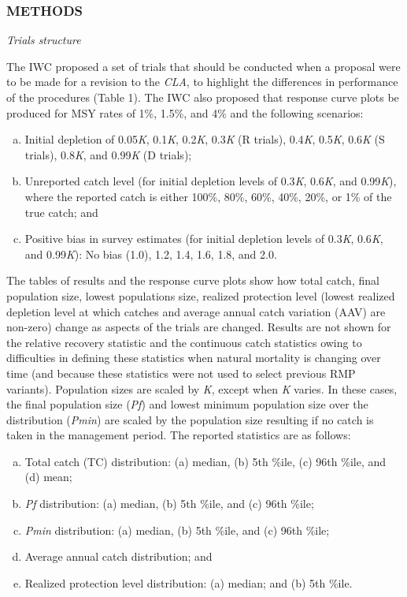 \documentclass[]{article}
\begin{document}
\subsubsection{METHODS}\label{methods}

\emph{Trials structure}

The IWC \autocite{iwc_2007} proposed a set of trials that should be
conducted when a proposal were to be made for a revision to the
\emph{CLA}, to highlight the differences in performance of the
procedures (Table 1). The IWC \autocite{iwc_2007} also proposed
that response curve plots be produced for MSY rates of 1\%, 1.5\%, and
4\% and the following scenarios:

\begin{enumerate}[a.]
\itemsep1pt\parskip0pt
\item
  Initial depletion of 0.05\emph{K}, 0.1\emph{K}, 0.2\emph{K},
  0.3\emph{K} (R trials), 0.4\emph{K}, 0.5\emph{K}, 0.6\emph{K} (S
  trials), 0.8\emph{K}, and 0.99\emph{K} (D trials);
\item
  Unreported catch level (for initial depletion levels of 0.3\emph{K},
  0.6\emph{K}, and 0.99\emph{K}), where the reported catch is either
  100\%, 80\%, 60\%, 40\%, 20\%, or 1\% of the true catch; and
\item
  Positive bias in survey estimates (for initial depletion levels of
  0.3\emph{K}, 0.6\emph{K}, and 0.99\emph{K}): No bias (1.0), 1.2, 1.4,
  1.6, 1.8, and 2.0.
\end{enumerate}

The tables of results and the response curve plots show how total catch,
final population size, lowest populations size, realized protection
level (lowest realized depletion level at which catches and
average annual catch variation (AAV) are non-zero)
change as aspects of the trials are changed.
Results are not shown for the relative recovery statistic
and the continuous catch statistics owing to difficulties in defining these
statistics when natural mortality is changing over time
(and because these statistics were not used to select previous RMP variants).
Population sizes are scaled by \emph{K}, except when \emph{K} varies.
In these cases, the final population size (\emph{Pf}) and lowest
minimum population size over the distribution (\emph{Pmin}) are scaled by
the population size resulting if no catch is taken in the management period.
The reported statistics are as follows:

\begin{enumerate}[a.]
\itemsep1pt\parskip0pt
\item
  Total catch (TC) distribution: (a) median, (b) 5th \%ile, (c) 96th
  \%ile, and (d) mean;
\item
  \emph{Pf} distribution: (a) median, (b) 5th \%ile, and (c) 96th \%ile;
\item
  \emph{Pmin} distribution: (a) median, (b) 5th \%ile, and (c) 96th
  \%ile;
\item
  Average annual catch distribution; and
\item
  Realized protection level distribution: (a) median; and (b) 5th \%ile.
\end{enumerate}
\end{document}
